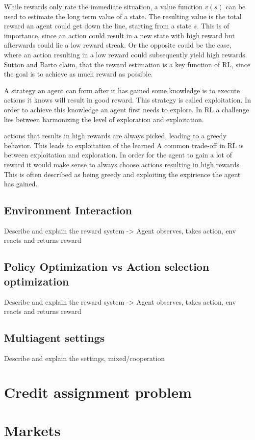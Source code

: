 While rewards only rate the immediate situation, a value function $v(s)$ can be
used to estimate the long term value of a state. The resulting value is the total reward
an agent could get down the line,
starting from a state $s$. This is of importance, since an action
could result in a new state with high reward but afterwards could lie a low reward
streak. Or the opposite could be the case, where an action resulting in a low reward
could subsequently yield high rewards. Sutton and Barto claim, that the reward estimation
is a key function of RL, since the goal is to achieve as much reward as possible.



A strategy an agent can form after it has gained some knowledge is to execute actions
it knows will result in good reward. This strategy is called exploitation. In order
to achieve this knowledge an agent first needs to explore. In RL a challenge lies 
between harmonizing the level of exploration and exploitation.

actions that results in high rewards are always picked, leading
to a greedy behavior. This leads to exploitation of the learned A common trade-off in RL is between exploitation and exploration. In order for the agent to gain a lot of reward it would make sense to always choose actions
resulting in high rewards. This is often described as being greedy and exploiting the 
expirience the agent has gained.


\subsection{Environment Interaction}
Describe and explain the reward system -> Agent observes, takes action,
env reacts and returns reward

\subsection{Policy Optimization vs Action selection optimization}
Describe and explain the reward system -> Agent observes, takes action,
env reacts and returns reward

\subsection{Multiagent settings}
Describe and explain the settings, mixed/cooperation

\section{Credit assignment problem}

\section{Markets}

